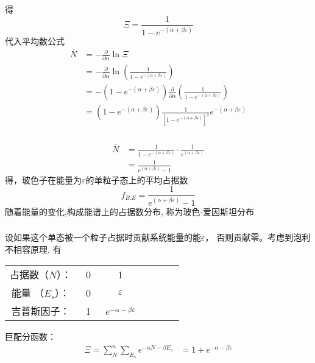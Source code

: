 \begin{frame}
  \frametitle{}
得
\[ \Xi = \frac{1}{1-e^{-(\alpha +\beta \varepsilon)}}\]
代入平均数公式
\[
\begin{aligned}
\overline{N} &= - \frac{\partial }{\partial \alpha } \ln \Xi \\
&= - \frac{\partial }{\partial \alpha } \ln (\frac{1}{1-e^{-(\alpha +\beta \varepsilon)}}) \\
&= - (1-e^{-(\alpha +\beta \varepsilon)})\frac{\partial }{\partial \alpha }  (\frac{1}{1-e^{-(\alpha +\beta \varepsilon)}}) \\
&= (1-e^{-(\alpha +\beta \varepsilon)}) \frac{1}{[1-e^{-(\alpha +\beta \varepsilon)}]^2} e^{-(\alpha +\beta \varepsilon)}
\end{aligned} 
  \]
\end{frame} 

\begin{frame}
  \frametitle{}
  \[
    \begin{aligned}
    \overline{N} 
    &=\frac{1}{1-e^{-(\alpha +\beta \varepsilon)}} \cdot \frac{1}{e^{(\alpha +\beta \varepsilon)}}\\
    &= \frac{1}{e^{(\alpha +\beta \varepsilon)}-1}
    \end{aligned} 
      \]
  得，玻色子在能量为$\varepsilon$的单粒子态上的平均占据数
\[ \boxed{f_{B.E} =  \frac{1}{e^{(\alpha +\beta \varepsilon)}-1}}\]
随着能量的变化,构成能谱上的占据数分布, 称为玻色-爱因斯坦分布
\end{frame} 

\begin{frame}
  \frametitle{}
  \解 设如果这个单态被一个粒子占据时贡献系统能量的能$\varepsilon$， 否则贡献零。考虑到泡利不相容原理, 有
\begin{table}[htbp]
  \centering\begin{tabular}{ccccccc}
    占据数（$N$）： & ~0~ & ~1~ \\
    能量 （$E_s$）： &  0 & $\varepsilon$\\
    吉普斯因子： & 1 & $e^{-\alpha -\beta \varepsilon }$ 
  \end{tabular}
\end{table}
巨配分函数：$$ 
\begin{aligned}
  \Xi = \sum_{N} ^n \sum_{E_s} e^{-\alpha N -\beta E_s}  
  &= 1+ e^{-\alpha -\beta \varepsilon }
\end{aligned}
$$ 
\end{frame} 

